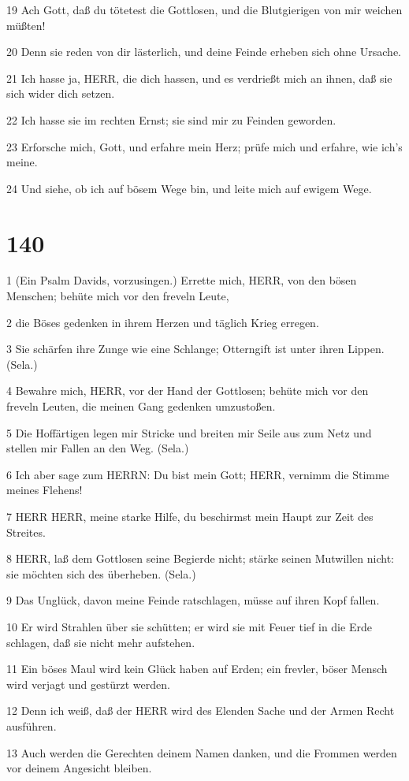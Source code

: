 \par 19 Ach Gott, daß du tötetest die Gottlosen, und die Blutgierigen von mir weichen müßten!
\par 20 Denn sie reden von dir lästerlich, und deine Feinde erheben sich ohne Ursache.
\par 21 Ich hasse ja, HERR, die dich hassen, und es verdrießt mich an ihnen, daß sie sich wider dich setzen.
\par 22 Ich hasse sie im rechten Ernst; sie sind mir zu Feinden geworden.
\par 23 Erforsche mich, Gott, und erfahre mein Herz; prüfe mich und erfahre, wie ich's meine.
\par 24 Und siehe, ob ich auf bösem Wege bin, und leite mich auf ewigem Wege.

\chapter{140}

\par 1 (Ein Psalm Davids, vorzusingen.) Errette mich, HERR, von den bösen Menschen; behüte mich vor den freveln Leute,
\par 2 die Böses gedenken in ihrem Herzen und täglich Krieg erregen.
\par 3 Sie schärfen ihre Zunge wie eine Schlange; Otterngift ist unter ihren Lippen. (Sela.)
\par 4 Bewahre mich, HERR, vor der Hand der Gottlosen; behüte mich vor den freveln Leuten, die meinen Gang gedenken umzustoßen.
\par 5 Die Hoffärtigen legen mir Stricke und breiten mir Seile aus zum Netz und stellen mir Fallen an den Weg. (Sela.)
\par 6 Ich aber sage zum HERRN: Du bist mein Gott; HERR, vernimm die Stimme meines Flehens!
\par 7 HERR HERR, meine starke Hilfe, du beschirmst mein Haupt zur Zeit des Streites.
\par 8 HERR, laß dem Gottlosen seine Begierde nicht; stärke seinen Mutwillen nicht: sie möchten sich des überheben. (Sela.)
\par 9 Das Unglück, davon meine Feinde ratschlagen, müsse auf ihren Kopf fallen.
\par 10 Er wird Strahlen über sie schütten; er wird sie mit Feuer tief in die Erde schlagen, daß sie nicht mehr aufstehen.
\par 11 Ein böses Maul wird kein Glück haben auf Erden; ein frevler, böser Mensch wird verjagt und gestürzt werden.
\par 12 Denn ich weiß, daß der HERR wird des Elenden Sache und der Armen Recht ausführen.
\par 13 Auch werden die Gerechten deinem Namen danken, und die Frommen werden vor deinem Angesicht bleiben.

